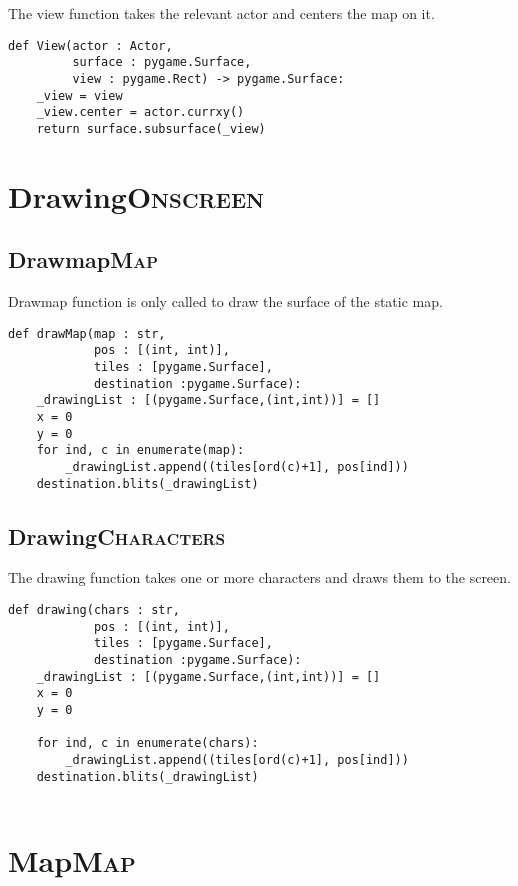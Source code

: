 \documentclass[11pt]{article}
\begin{document}
The view function takes the relevant actor and centers the map on it.

\begin{verbatim}
def View(actor : Actor,
         surface : pygame.Surface,
         view : pygame.Rect) -> pygame.Surface:
    _view = view
    _view.center = actor.currxy()
    return surface.subsurface(_view)
\end{verbatim}


\section{Drawing\hfill{}\textsc{Onscreen}}
\label{sec:org77386a0}

\subsection{Drawmap\hfill{}\textsc{Map}}
\label{sec:org8b48d21}
Drawmap function is only called to draw the surface of the static map.

\begin{verbatim}
def drawMap(map : str,
            pos : [(int, int)],
            tiles : [pygame.Surface],
            destination :pygame.Surface):
    _drawingList : [(pygame.Surface,(int,int))] = []
    x = 0
    y = 0
    for ind, c in enumerate(map):
        _drawingList.append((tiles[ord(c)+1], pos[ind]))
    destination.blits(_drawingList)
\end{verbatim}

\subsection{Drawing\hfill{}\textsc{Characters}}
\label{sec:org181906c}
The drawing function takes one or more characters and draws them to the screen.

\begin{verbatim}
def drawing(chars : str,
            pos : [(int, int)],
            tiles : [pygame.Surface],
            destination :pygame.Surface):
    _drawingList : [(pygame.Surface,(int,int))] = []
    x = 0
    y = 0

    for ind, c in enumerate(chars):
        _drawingList.append((tiles[ord(c)+1], pos[ind]))
    destination.blits(_drawingList)


\end{verbatim}


\section{Map\hfill{}\textsc{Map}}
\label{sec:orga47f204}
\end{document}
